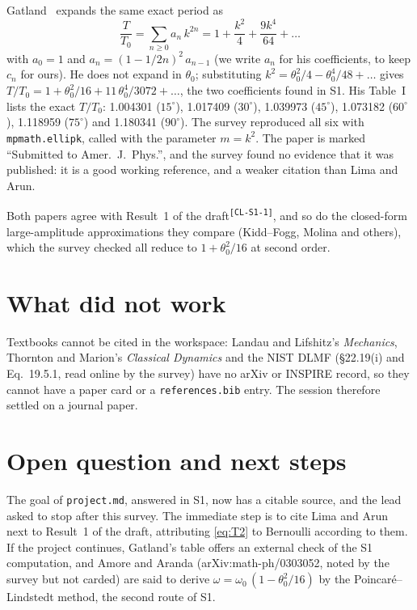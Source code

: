 \documentclass[11pt]{article}
\newcommand{\card}[1]{\textsuperscript{\texttt{[#1]}}}
\begin{document}
Gatland~\cite{gatland2007} expands the same exact period as
\begin{equation}
  \frac{T}{T_0} = \sum_{n \ge 0} a_n\,k^{2n}
  = 1 + \frac{k^2}{4} + \frac{9k^4}{64} + \dots
  \label{eq:kseries}
\end{equation}
with $a_0 = 1$ and $a_n = (1 - 1/2n)^2\,a_{n-1}$ (we write $a_n$ for his
coefficients, to keep $c_n$ for ours). He does not
expand in $\theta_0$; substituting $k^2 = \theta_0^2/4 - \theta_0^4/48 + \dots$
gives $T/T_0 = 1 + \theta_0^2/16 + 11\,\theta_0^4/3072 + \dots$, the two
coefficients found in S1. His Table~I lists the exact $T/T_0$: 1.004301
($15^\circ$), 1.017409 ($30^\circ$), 1.039973 ($45^\circ$), 1.073182
($60^\circ$), 1.118959 ($75^\circ$) and 1.180341 ($90^\circ$). The survey
reproduced all six with \texttt{mpmath.ellipk}, called with the parameter
$m = k^2$. The paper is marked ``Submitted to Amer.\ J.\ Phys.'', and the survey
found no evidence that it was published: it is a good working reference, and a
weaker citation than Lima and Arun.

Both papers agree with Result~1 of the draft\card{CL-S1-1}, and so do the
closed-form large-amplitude approximations they compare (Kidd--Fogg, Molina and
others), which the survey checked all reduce to $1 + \theta_0^2/16$ at second
order.

\section{What did not work}
Textbooks cannot be cited in the workspace: Landau and Lifshitz's
\emph{Mechanics}, Thornton and Marion's \emph{Classical Dynamics} and the NIST
DLMF (\S22.19(i) and Eq.~19.5.1, read online by the survey) have no arXiv or
INSPIRE record, so they cannot have a paper card or a \texttt{references.bib}
entry. The session therefore settled on a journal paper.

\section{Open question and next steps}
The goal of \texttt{project.md}, answered in S1, now has a citable source,
and the lead asked to stop after this survey. The immediate step is to cite
Lima and Arun~\cite{lima2006} next to Result~1 of the draft, attributing
\eqref{eq:T2} to Bernoulli according to them. If the project continues,
Gatland's table offers an external check of the S1 computation, and Amore and
Aranda (arXiv:math-ph/0303052, noted by the survey but not carded) are said to
derive $\omega = \omega_0\,(1 - \theta_0^2/16)$ by the Poincar\'e--Lindstedt
method, the second route of S1.



\end{document}
